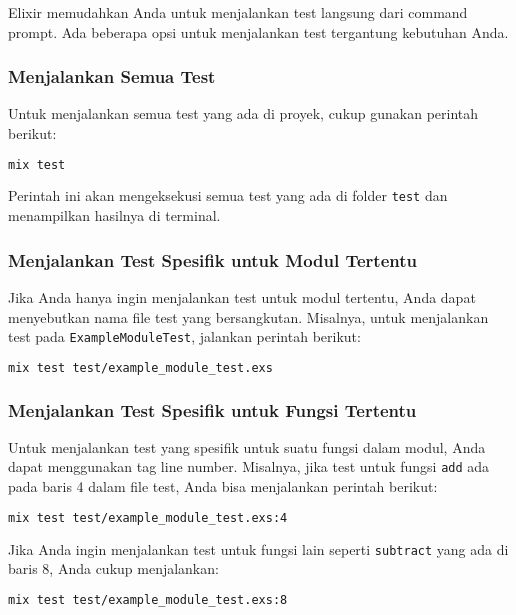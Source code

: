 Elixir memudahkan Anda untuk menjalankan test langsung dari command prompt. Ada beberapa opsi untuk menjalankan test tergantung kebutuhan Anda.

\subsubsection{Menjalankan Semua Test}

Untuk menjalankan semua test yang ada di proyek, cukup gunakan perintah berikut:

\begin{lstlisting}[language=Bash]
	mix test
\end{lstlisting}

Perintah ini akan mengeksekusi semua test yang ada di folder \texttt{test} dan menampilkan hasilnya di terminal.

\subsubsection{Menjalankan Test Spesifik untuk Modul Tertentu}

Jika Anda hanya ingin menjalankan test untuk modul tertentu, Anda dapat menyebutkan nama file test yang bersangkutan. Misalnya, untuk menjalankan test pada \texttt{ExampleModuleTest}, jalankan perintah berikut:

\begin{lstlisting}[language=Bash]
	mix test test/example_module_test.exs
\end{lstlisting}

\subsubsection{Menjalankan Test Spesifik untuk Fungsi Tertentu}

Untuk menjalankan test yang spesifik untuk suatu fungsi dalam modul, Anda dapat menggunakan tag line number. Misalnya, jika test untuk fungsi \texttt{add} ada pada baris 4 dalam file test, Anda bisa menjalankan perintah berikut:

\begin{lstlisting}[language=Bash]
	mix test test/example_module_test.exs:4
\end{lstlisting}

Jika Anda ingin menjalankan test untuk fungsi lain seperti \texttt{subtract} yang ada di baris 8, Anda cukup menjalankan:

\begin{lstlisting}[language=Bash]
	mix test test/example_module_test.exs:8
\end{lstlisting}

